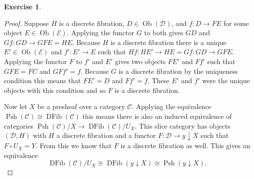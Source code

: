 \documentclass{article}
\newcommand{\cat}{\mathcal{C}}
\newcommand{\catt}{\mathcal{D}}
\newcommand{\cattt}{\mathcal{E}}
\DeclareMathOperator{\objects}{Ob}
\DeclareMathOperator{\psh}{Psh}
\DeclareMathOperator{\dfib}{DFib}
\theoremstyle{definition}
\newtheorem{question}{Exercise}
\begin{document}
\begin{question}
\begin{enumerate}[(a)]
\begin{proof}
                  Suppose \(H\) is a discrete fibration,
                  \(D\in\objects(\catt)\), and \(f:D\to FE\) for some object
                  \(E\in\objects(\cattt)\). Applying the functor \(G\) to both
                  gives \(GD\) and \(Gf:GD\to GFE=HE\). Because \(H\) is a
                  discrete fibration there is a unique \(E'\in\objects(\cattt)\)
                  and \(f':E'\to E\) such that \(Hf:HE'\to HE=Gf:GD\to GFE\).
                  Applying the functor \(F\) to \(f'\) and \(E'\) gives two
                  objects \(FE'\) and \(Ff'\) such that \(GFE=FC\) and
                  \(GFf'=f\). Because \(G\) is a discrete fibration by the
                  uniqueness condition this means that \(FE'=D\) and \(Ff'=f\).
                  These \(E'\) and \(f'\) were the unique objects with this
                  condition and so \(F\) is a discrete fibration.

                  Now let \(X\) be a presheaf over a category \(\cat\). Applying
                  the equivalence \(\psh(\cat)\cong\dfib(\cat)\) this means
                  there is also an induced equivalence of categories
                  \(\psh(\cat)/X\to\dfib(\cat)/U_{X}\). This slice category has
                  objects \((\catt,H)\) with \(H\) a discrete fibration and a
                  functor \(F:\catt\to y\downarrow X\) such that \(F\circ
                  U_{X}=Y\). From this we know that \(F\) is a discrete
                  fibration as well. This gives an equivalence
                  \[
                      \dfib(\cat)/U_{X}\cong \dfib(y\downarrow X)\cong\psh(y\downarrow X).
                  \]
              \end{proof}
    \end{enumerate}
\end{question}
\end{document}
